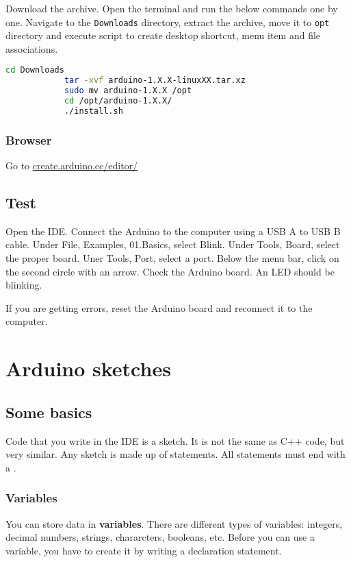 \documentclass{article}
\begin{document}
			Download the  archive. Open the terminal and run the below commands one by one\@. Navigate to the \texttt{Downloads} directory, extract the archive, move it to \texttt{opt} directory and execute script to create desktop shortcut, menu item and file associations.

			\begin{lstlisting}[language=bash]
			cd Downloads
			tar -xvf arduino-1.X.X-linuxXX.tar.xz
			sudo mv arduino-1.X.X /opt
			cd /opt/arduino-1.X.X/
			./install.sh
			\end{lstlisting}

		\subsubsection{Browser}
			Go to \url{create.arduino.cc/editor/}

	\subsection{Test}

		Open the IDE\@. Connect the Arduino to the computer using a USB A to USB B cable. Under File, Examples, 01.Basics, select Blink. Under Tools, Board, select the proper board. Uner Tools, Port, select a port. Below the menu bar, click on the second circle with an arrow. Check the Arduino board. An LED should be blinking.

		If you are getting errors, reset the Arduino board and reconnect it to the computer.

\section{Arduino sketches}

	\subsection{Some basics}

		Code that you write in the IDE is a sketch. It is not the same as C++ code, but very similar. Any sketch is made up of statements. All statements must end with a \inlncd{;}.
	
		\subsubsection{Variables}

			You can store data in \textbf{variables}. There are different types of variables: integers, decimal numbers, strings, chararcters, booleans, etc. Before you can use a variable, you have to create it by writing a declaration statement.
\end{document}
